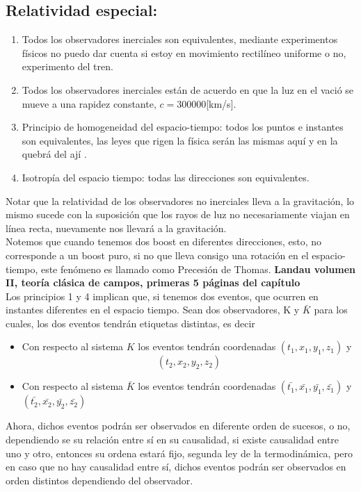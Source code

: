 \documentclass[../main.tex]{subfiles}
\begin{document}
\subsection*{Relatividad especial:}
\begin{enumerate}
    \item Todos los observadores inerciales son equivalentes, mediante experimentos físicos no puedo dar cuenta si estoy en movimiento rectilíneo uniforme o no, experimento del tren. 
    \item Todos los observadores inerciales están de acuerdo en que la luz en el vació se mueve a una rapidez constante, $c=300000$[km/s].
    \item Principio de homogeneidad del espacio-tiempo: todos los puntos e instantes son equivalentes, las leyes que rigen la física serán las mismas aquí y en la quebrá del ají .
    \item Isotropía del espacio tiempo: todas las direcciones son equivalentes.
\end{enumerate}
Notar que la relatividad de los observadores no inerciales lleva a la gravitación, lo mismo sucede con la suposición que los rayos de luz no necesariamente viajan en línea recta, nuevamente nos llevará a la gravitación. \\
Notemos que cuando tenemos dos boost en diferentes direcciones, esto, no corresponde a un boost puro, si no que lleva consigo una rotación en el espacio- tiempo, este fenómeno es llamado como Precesión de Thomas. 
\textbf{Landau volumen II, teoría clásica de campos, primeras 5 páginas del capítulo} \\
Los principios 1 y 4 implican que, si tenemos dos eventos, que ocurren en instantes diferentes en el espacio tiempo. Sean dos observadores, K y $\bar{K}$ para los cuales, los dos eventos tendrán etiquetas distintas, es decir
\begin{itemize}
    \item Con respecto al sistema $K$ los eventos tendrán coordenadas $(t_1,x_1,y_1,z_1)$ y $$(t_2,x_2,y_2,z_2)$$
    \item Con respecto al sistema $\bar{K}$ los eventos tendrán coordenadas $(\bar{t_1},\bar{x_1},\bar{y_1},\bar{z_1})$ y $(\bar{t_2},\bar{x_2},\bar{y_2},\bar{z_2})$
\end{itemize}
Ahora, dichos eventos podrán ser observados en diferente orden de sucesos, o no, dependiendo se su relación entre sí en su causalidad, si existe causalidad entre uno y otro, entonces su ordena estará fijo, segunda ley de la termodinámica, pero en caso que no hay causalidad entre sí, dichos eventos podrán ser observados en orden distintos dependiendo del observador.\\
\end{document}
